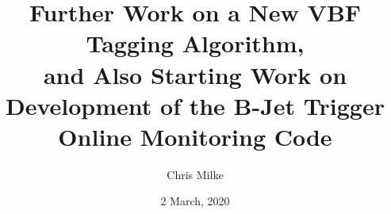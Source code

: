 \documentclass{beamer}
\begin{document}
    \title{Further Work on a New VBF Tagging Algorithm,\\ and Also Starting Work on Development of the B-Jet Trigger Online Monitoring Code}
    \author{Chris Milke}
    \date{2 March, 2020}

    \frame{\titlepage}




    

    
\end{document}
